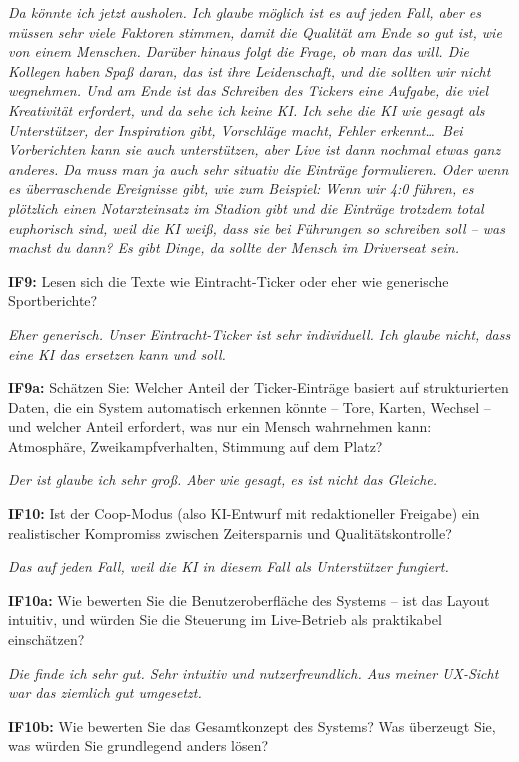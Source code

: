 \textit{Da könnte ich jetzt ausholen. Ich glaube möglich ist es auf jeden Fall, aber es müssen sehr viele Faktoren stimmen, damit die Qualität am Ende so gut ist, wie von einem Menschen. Darüber hinaus folgt die Frage, ob man das will. Die Kollegen haben Spaß daran, das ist ihre Leidenschaft, und die sollten wir nicht wegnehmen. Und am Ende ist das Schreiben des Tickers eine Aufgabe, die viel Kreativität erfordert, und da sehe ich keine KI. Ich sehe die KI wie gesagt als Unterstützer, der Inspiration gibt, Vorschläge macht, Fehler erkennt\ldots\ Bei Vorberichten kann sie auch unterstützen, aber Live ist dann nochmal etwas ganz anderes. Da muss man ja auch sehr situativ die Einträge formulieren. Oder wenn es überraschende Ereignisse gibt, wie zum Beispiel: Wenn wir 4:0 führen, es plötzlich einen Notarzteinsatz im Stadion gibt und die Einträge trotzdem total euphorisch sind, weil die KI weiß, dass sie bei Führungen so schreiben soll -- was machst du dann? Es gibt Dinge, da sollte der Mensch im Driverseat sein.}

\textbf{IF9:} Lesen sich die Texte wie Eintracht-Ticker oder eher wie generische Sportberichte?

\textit{Eher generisch. Unser Eintracht-Ticker ist sehr individuell. Ich glaube nicht, dass eine KI das ersetzen kann und soll.}

\textbf{IF9a:} Schätzen Sie: Welcher Anteil der Ticker-Einträge basiert auf strukturierten Daten, die ein System automatisch erkennen könnte -- Tore, Karten, Wechsel -- und welcher Anteil erfordert, was nur ein Mensch wahrnehmen kann: Atmosphäre, Zweikampfverhalten, Stimmung auf dem Platz?

\textit{Der ist glaube ich sehr groß. Aber wie gesagt, es ist nicht das Gleiche.}

\textbf{IF10:} Ist der Coop-Modus (also KI-Entwurf mit redaktioneller Freigabe) ein realistischer Kompromiss zwischen Zeitersparnis und Qualitätskontrolle?

\textit{Das auf jeden Fall, weil die KI in diesem Fall als Unterstützer fungiert.}

\textbf{IF10a:} Wie bewerten Sie die Benutzeroberfläche des Systems -- ist das Layout intuitiv, und würden Sie die Steuerung im Live-Betrieb als praktikabel einschätzen?

\textit{Die finde ich sehr gut. Sehr intuitiv und nutzerfreundlich. Aus meiner UX-Sicht war das ziemlich gut umgesetzt.}

\textbf{IF10b:} Wie bewerten Sie das Gesamtkonzept des Systems? Was überzeugt Sie, was würden Sie grundlegend anders lösen?

